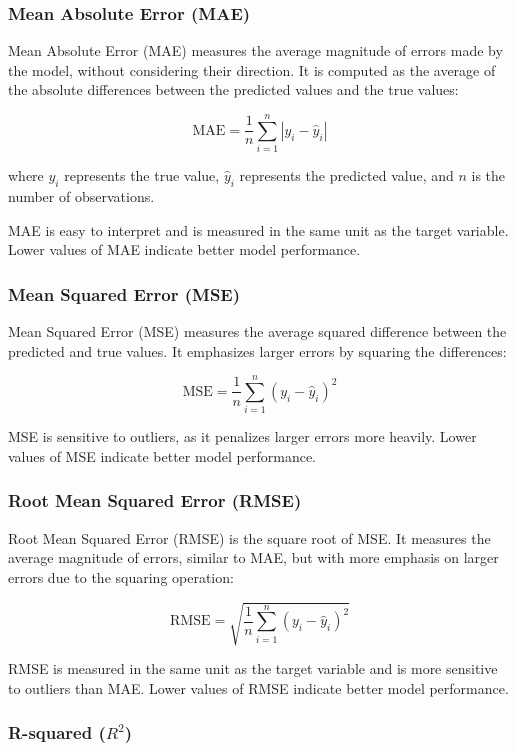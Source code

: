 \documentclass[12pt]{article}
\begin{document}
\subsubsection{Mean Absolute Error (MAE)}

Mean Absolute Error (MAE) measures the average magnitude of errors made by the model, without considering their direction. It is computed as the average of the absolute differences between the predicted values and the true values:

$$ \text{MAE} = \frac{1}{n} \sum_{i=1}^{n} |y_i - \hat{y}_i| $$

where $y_i$ represents the true value, $\hat{y}_i$ represents the predicted value, and $n$ is the number of observations.

MAE is easy to interpret and is measured in the same unit as the target variable. Lower values of MAE indicate better model performance.

\subsubsection{Mean Squared Error (MSE)}

Mean Squared Error (MSE) measures the average squared difference between the predicted and true values. It emphasizes larger errors by squaring the differences:

$$ \text{MSE} = \frac{1}{n} \sum_{i=1}^{n} (y_i - \hat{y}_i)^2 $$

MSE is sensitive to outliers, as it penalizes larger errors more heavily. Lower values of MSE indicate better model performance.

\subsubsection{Root Mean Squared Error (RMSE)}

Root Mean Squared Error (RMSE) is the square root of MSE. It measures the average magnitude of errors, similar to MAE, but with more emphasis on larger errors due to the squaring operation:

$$ \text{RMSE} = \sqrt{\frac{1}{n} \sum_{i=1}^{n} (y_i - \hat{y}_i)^2} $$

RMSE is measured in the same unit as the target variable and is more sensitive to outliers than MAE. Lower values of RMSE indicate better model performance.

\subsubsection{R-squared ($R^2$)}
\end{document}

